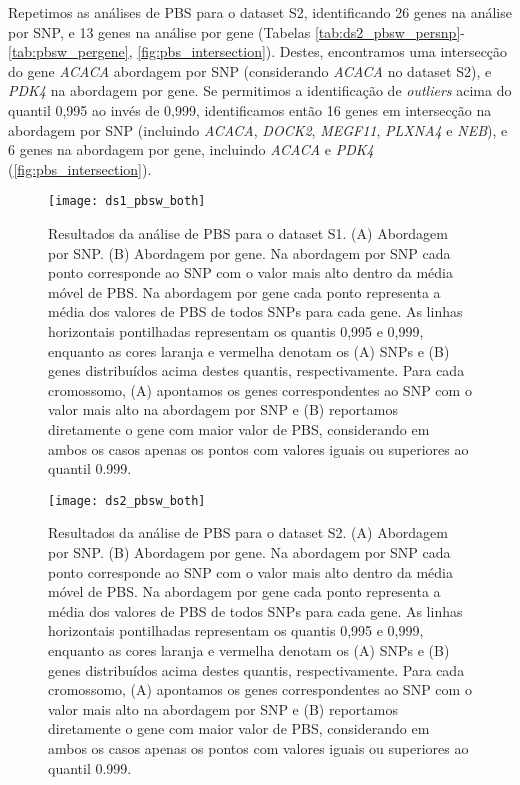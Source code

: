 Repetimos as análises de PBS para o dataset S2, identificando 26 genes na análise por SNP, e 13 genes na análise por gene (Tabelas \ref{tab:ds2_pbsw_persnp}-\ref{tab:pbsw_pergene}, \autoref{fig:pbs_intersection}). Destes, encontramos uma intersecção do gene \textsl{ACACA} abordagem por SNP (considerando \textsl{ACACA} no dataset S2), e \textsl{PDK4} na abordagem por gene. Se permitimos a identificação de \textit{outliers} acima do quantil 0,995 ao invés de 0,999, identificamos então 16 genes em intersecção na abordagem por SNP (incluindo \textsl{ACACA}, \textsl{DOCK2}, \textsl{MEGF11}, \textsl{PLXNA4} e  \textsl{NEB}), e 6 genes na abordagem por gene, incluindo \textsl{ACACA} e \textsl{PDK4} (\autoref{fig:pbs_intersection}).


\begin{figure}[!htbp] %
    \centering
    \texttt{[image: ds1\_pbsw\_both]}
    \caption[Resultados da análise de PBS para o dataset S1.]{Resultados da análise de PBS para o dataset S1. (A) Abordagem por SNP. (B) Abordagem por gene. Na abordagem por SNP cada ponto corresponde ao SNP com o valor mais alto dentro da média móvel de PBS. Na abordagem por gene cada ponto representa a média dos valores de PBS de todos SNPs para cada gene. As linhas horizontais pontilhadas representam os quantis 0,995 e 0,999, enquanto as cores laranja e vermelha denotam os (A) SNPs e (B) genes distribuídos acima destes quantis, respectivamente. Para cada cromossomo, (A) apontamos os genes correspondentes ao SNP com o valor mais alto na abordagem por SNP e (B) reportamos diretamente o gene com maior valor de PBS, considerando em ambos os casos apenas os pontos com valores iguais ou superiores ao quantil 0.999.}
    \label{fig:ds1_pbsw_both}
\end{figure}


\begin{figure}[!htbp] %
    \centering
    \texttt{[image: ds2\_pbsw\_both]}
    \caption[Resultados da análise de PBS para o dataset S2.]{Resultados da análise de PBS para o dataset S2. (A) Abordagem por SNP. (B) Abordagem por gene. Na abordagem por SNP cada ponto corresponde ao SNP com o valor mais alto dentro da média móvel de PBS. Na abordagem por gene cada ponto representa a média dos valores de PBS de todos SNPs para cada gene. As linhas horizontais pontilhadas representam os quantis 0,995 e 0,999, enquanto as cores laranja e vermelha denotam os (A) SNPs e (B) genes distribuídos acima destes quantis, respectivamente. Para cada cromossomo, (A) apontamos os genes correspondentes ao SNP com o valor mais alto na abordagem por SNP e (B) reportamos diretamente o gene com maior valor de PBS, considerando em ambos os casos apenas os pontos com valores iguais ou superiores ao quantil 0.999.}
    \label{fig:ds2_pbsw_both}
\end{figure}

